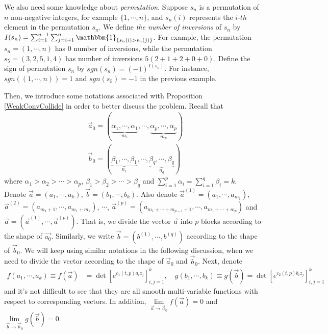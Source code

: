 We also need some knowledge about \emph{permutation}. Suppose $s_{n}$ is a permutation of $n$ non-negative integers, for example $\{1,\cdots,n\}$, and $s_{n}(i)$ represents the $i$-$th$ element in the permutation $s_{n}$. We define \emph{the number of inversions} of $s_{n}$ by $I(s_{n})=\sum_{i=1}^{n-1}\sum_{j=i+1}^{n}\mathbbm{1}_{\{s_{n}(i)>s_{n}(j)\}}$. For example, the permutation $s_{n}=(1,\cdots,n)$ has $0$ number of inversions, while the permutation $s_{5}=(3,2,5,1,4)$ has number of inversions $5(2+1+2+0+0)$. Define the sign of permutation $s_{n}$ by $sgn(s_{n})=(-1)^{I(s_{n})}$. For instance, $sgn((1,\cdots,n))=1$ and $sgn(s_{5})=-1$ in the previous example.

Then, we introduce some notations associated with Proposition \ref{WeakConvCollide} in order to better discuss the problem. Recall that
\begin{align*}
	&\vec{a}_{0}=(\underbrace{\alpha_{1},\cdots,\alpha_{1}}_{m_{1}},\cdots,\underbrace{\alpha_{p},\cdots,\alpha_{p}}_{m_{p}})\\
	&\vec{b}_{0}=(\underbrace{\beta_{1},\cdots,\beta_{1}}_{n_{1}},\cdots,\underbrace{\beta_{q},\cdots,\beta_{q}}_{n_{q}})
\end{align*}
where $\alpha_{1}>\alpha_{2}>\cdots>\alpha_{p}$, $\beta_{1}>\beta_{2}>\cdots>\beta_{q}$ and $\sum_{i=1}^{p}\alpha_{i}=\sum_{i=1}^{q}\beta_{i}=k$. Denote $\vec{a}=(a_{1},\cdots,a_{k})$, $\vec{b}=(b_{1},\cdots,b_{k})$. Also denote $\vec{a}^{(1)}=(a_{1},\cdots,a_{m_1})$, $\vec{a}^{(2)}=(a_{m_{1}+1},\cdots,a_{m_1+m_2})$, $\cdots$, $\vec{a}^{(p)}=(a_{m_1+\cdots+m_{p-1}+1},\cdots, a_{m_1+\cdots+m_{p}})$ and $\vec{a}=(\vec{a}^{(1)},\cdots,\vec{a}^{(p)})$. That is, we divide the vector $\vec{a}$ into $p$ blocks according to the shape of $\vec{a_{0}}$. Similarly, we write $\vec{b}=(b^{(1)},\cdots,b^{(q)})$ according to the shape of $\vec{b}_{0}$. We will keep using similar notations in the following discussion, when we need to divide the vector according to the shape of $\vec{a}_{0}$ and $\vec{b}_{0}$. Next, denote
\begin{align*}
	f(a_{1},\cdots,a_{k})\equiv f(\vec{a})&=\det[e^{c_1(t,p)a_{i}z_{j}}]_{i,j=1}^{k},\quad g(b_{1},\cdots,b_{k})\equiv g(\vec{b})=\det[e^{c_2(t,p)b_{i}z_{j}}]_{i,j=1}^{k}
\end{align*} 
and it's not difficult to see that they are all smooth multi-variable functions with respect to corresponding vectors. In addition, $\lim\limits_{\vec{a}\rightarrow\vec{a}_{0}}f(\vec{a})=0$ and $\lim\limits_{\vec{b}\rightarrow\vec{b}_{0}}g(\vec{b})=0$. 

